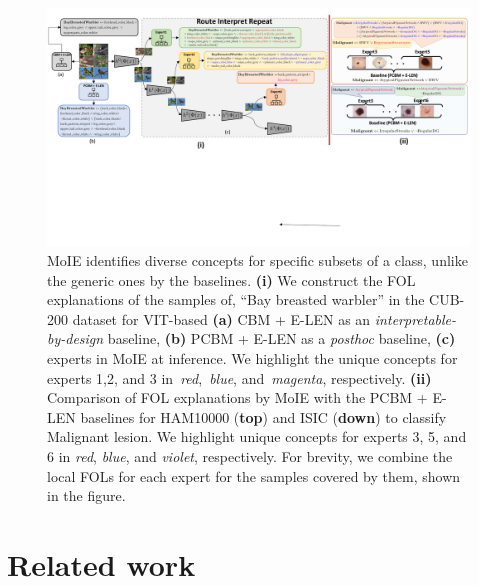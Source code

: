 \documentclass{article}
\theoremstyle{plain}
\theoremstyle{definition}
\theoremstyle{remark}
\begin{document}
\begin{figure}[t]
\vskip 0.1in
\begin{center}
\centerline{\includegraphics[width=\linewidth]{figures/main/Results_all.pdf}}
\caption{MoIE identifies diverse concepts for specific subsets of a class, unlike the generic ones by the baselines. \textbf{(i)} We construct the FOL explanations of the samples of, ``Bay breasted warbler'' in the CUB-200 dataset for VIT-based \textbf{(a)} CBM + E-LEN as an \emph{interpretable-by-design} baseline, \textbf{(b)} PCBM + E-LEN as a \emph{posthoc} baseline, \textbf{(c)} experts in MoIE at inference. We highlight the unique concepts for experts 1,2, and 3 in~\emph{red},~\emph{blue}, and~\emph{magenta}, respectively. \textbf{(ii)} Comparison of FOL explanations by MoIE with the PCBM + E-LEN baselines for HAM10000 (\textbf{top}) and ISIC (\textbf{down})  to classify Malignant lesion. We highlight unique concepts for experts 3, 5, and 6 in \emph{red}, \emph{blue}, and \emph{violet}, respectively. For brevity, we combine the local FOLs for each expert for the samples covered by them, shown in the figure.}
\label{fig:local_ex_cub}
\end{center}
\vskip -0.1in
\end{figure}

\section{Related work}
%

\end{document}
